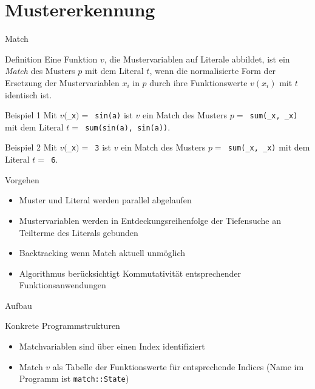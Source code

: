 \documentclass{beamer}
\begin{document}
\section{Mustererkennung}
\begin{frame}[fragile]{Match}
	\begin{block}{Definition}
		Eine Funktion $v$, die Mustervariablen auf Literale abbildet, ist ein \emph{Match} des Musters $p$ mit dem Literal $t$, wenn die normalisierte Form der Ersetzung der Mustervariablen $x_i$ in $p$ durch ihre Funktionswerte $v(x_i)$ mit $t$ identisch ist.
	\end{block}
	
	\pause
	\begin{block}{Beispiel 1}
		Mit $v($\verb~_x~$) =$\verb~ sin(a)~ ist $v$ ein Match des
		Musters $p =$\verb~ sum(_x, _x)~ mit dem Literal $t =$\verb~ sum(sin(a), sin(a))~.
	\end{block}
	
	\pause
	\begin{block}{Beispiel 2}
		Mit $v($\verb~_x~$) =$\verb~ 3~ ist $v$ ein Match des
		Musters $p =$\verb~ sum(_x, _x)~ mit dem Literal $t =$\verb~ 6~.
	\end{block}
\end{frame}


\begin{frame}[fragile]{Vorgehen}
	\begin{itemize}
		\item{Muster und Literal werden parallel abgelaufen}
		\item{Mustervariablen werden in Entdeckungsreihenfolge der Tiefensuche an Teilterme des Literals gebunden}
		\item{Backtracking wenn Match aktuell unmöglich}
		\item{Algorithmus berücksichtigt Kommutativität entsprechender Funktionsanwendungen}
	\end{itemize}
\end{frame}





\begin{frame}[fragile]{Aufbau}


	Konkrete Programmstrukturen
	\begin{itemize}
		\item{Matchvariablen sind über einen Index identifiziert}
		\item{Match $v$ als Tabelle der Funktionswerte für entsprechende Indices (Name im Programm ist \verb~match::State~)}
	\end{itemize}
\end{frame}
\end{document}
